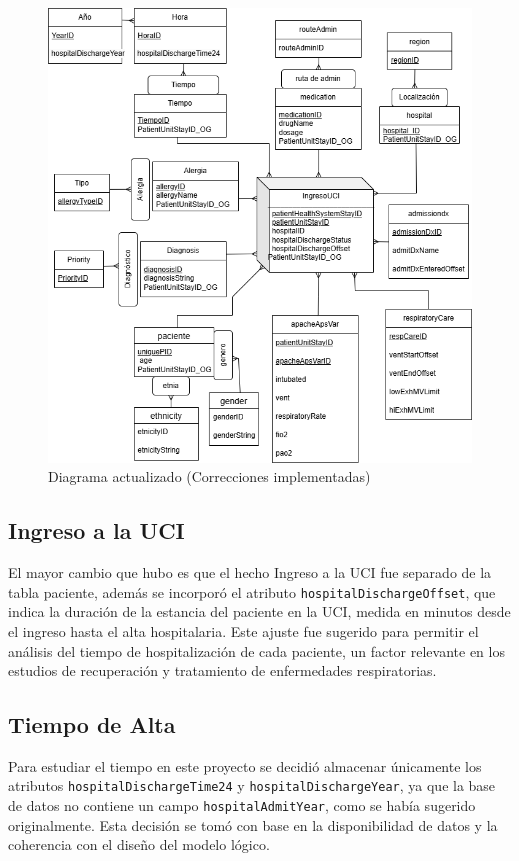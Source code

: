 \documentclass[12pt, a4paper, twoside]{article}
\begin{document}
	
	\begin{figure}[h!]
		\centering
		\includegraphics[width=1\textwidth]{image/diagrama_correcicones.png}
		\caption{Diagrama actualizado (Correcciones implementadas)}
		\label{fig:1}
	\end{figure}
	
	\subsection{Ingreso a la UCI}
	El mayor cambio que hubo es que el hecho Ingreso a la UCI fue separado de la tabla paciente, además se incorporó el atributo \texttt{hospitalDischargeOffset}, que indica la duración de la estancia del paciente en la UCI, medida en minutos desde el ingreso hasta el alta hospitalaria. Este ajuste fue sugerido para permitir el análisis del tiempo de hospitalización de cada paciente, un factor relevante en los estudios de recuperación y tratamiento de enfermedades respiratorias.
	
	\subsection{Tiempo de Alta}
	Para estudiar el tiempo en este proyecto se decidió almacenar únicamente los atributos \texttt{hospitalDischargeTime24} y \texttt{hospitalDischargeYear}, ya que la base de datos no contiene un campo \texttt{hospitalAdmitYear}, como se había sugerido originalmente. Esta decisión se tomó con base en la disponibilidad de datos y la coherencia con el diseño del modelo lógico.
	
\end{document}
